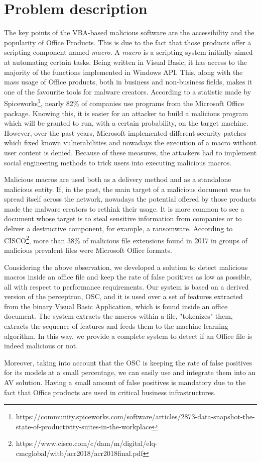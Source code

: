 \section{Problem description}

The key points of the VBA-based malicious software are the accessibility and the popularity of Office Products. This is due to the fact that those products offer a scripting component named \textit{macro}. A \textit{macro} is a scripting system initially aimed at automating certain tasks. Being written in Visual Basic, it has access to the majority of the functions implemented in Windows API. This, along with the mass usage of Office products, both in business and non-business fields, makes it one of the favourite tools for malware creators. According to a statistic made by Spiceworks\footnote{https://community.spiceworks.com/software/articles/2873-data-snapshot-the-state-of-productivity-suites-in-the-workplace}, nearly 82\% of companies use programs from the Microsoft Office package. Knowing this, it is easier for an attacker to build a malicious program which will be granted to run, with a certain probability, on the target machine. However, over the past years, Microsoft implemented different security patches which fixed known vulnerabilities and nowadays the execution of a macro without user content is denied. Because of these measures, the attackers had to implement social engineering methods to trick users into executing malicious macros.
\par
Malicious macros are used both as a delivery method and as a standalone malicious entity. If, in the past, the main target of a malicious document was to spread itself across the network, nowadays the potential offered by those products made the malware creators to rethink their usage. It is more common to see a document whose target is to steal sensitive information from companies or to deliver a destructive component, for example, a ransomware. According to CISCO\footnote{https://www.cisco.com/c/dam/m/digital/elq-cmcglobal/witb/acr2018/acr2018final.pdf}, more than 38\% of malicious file extensions found in 2017 in groups of malicious prevalent files were Microsoft Office formats.
\par
Considering the above observation, we developed a solution to detect malicious macros inside an office file and keep the rate of false positives as low as possible, all with respect to performance requirements. Our system is based on a derived version of the perceptron, OSC\cite{OSC}, and it is used over a set of features extracted from the binary Visual Basic Application, which is found inside an office document. The system extracts the macros within a file, "tokenizes" them, extracts the sequence of features and feeds them to the machine learning algorithm. In this way, we provide a complete system to detect if an Office file is indeed malicious or not.
\par
Moreover, taking into account that the OSC is keeping the rate of false positives for its models at a small percentage, we can easily use and integrate them into an AV solution. Having a small amount of false positives is mandatory due to the fact that Office products are used in critical business infrastructures.
